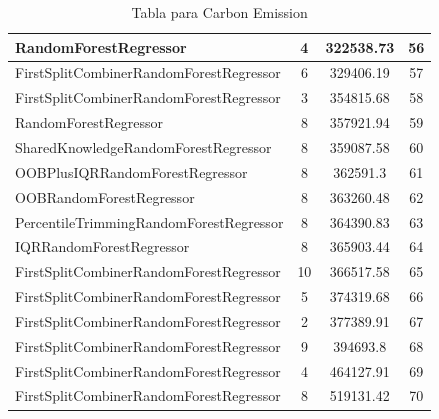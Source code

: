 \begin{table}[h]
\begin{tabular}{|l|c|c|c|}
\textcolor[HTML]{87bc45}{RandomForestRegressor} & 4 & 322538.73 & 56 \\ \hline
\textcolor[HTML]{ea5545}{FirstSplitCombinerRandomForestRegressor} & 6 & 329406.19 & 57 \\ \hline
\textcolor[HTML]{ea5545}{FirstSplitCombinerRandomForestRegressor} & 3 & 354815.68 & 58 \\ \hline
\textcolor[HTML]{87bc45}{RandomForestRegressor} & 8 & 357921.94 & 59 \\ \hline
\textcolor[HTML]{ef9b20}{SharedKnowledgeRandomForestRegressor} & 8 & 359087.58 & 60 \\ \hline
\textcolor[HTML]{ede15b}{OOBPlusIQRRandomForestRegressor} & 8 & 362591.3 & 61 \\ \hline
\textcolor[HTML]{b33dc6}{OOBRandomForestRegressor} & 8 & 363260.48 & 62 \\ \hline
\textcolor[HTML]{f46a9b}{PercentileTrimmingRandomForestRegressor} & 8 & 364390.83 & 63 \\ \hline
\textcolor[HTML]{27aeef}{IQRRandomForestRegressor} & 8 & 365903.44 & 64 \\ \hline
\textcolor[HTML]{ea5545}{FirstSplitCombinerRandomForestRegressor} & 10 & 366517.58 & 65 \\ \hline
\textcolor[HTML]{ea5545}{FirstSplitCombinerRandomForestRegressor} & 5 & 374319.68 & 66 \\ \hline
\textcolor[HTML]{ea5545}{FirstSplitCombinerRandomForestRegressor} & 2 & 377389.91 & 67 \\ \hline
\textcolor[HTML]{ea5545}{FirstSplitCombinerRandomForestRegressor} & 9 & 394693.8 & 68 \\ \hline
\textcolor[HTML]{ea5545}{FirstSplitCombinerRandomForestRegressor} & 4 & 464127.91 & 69 \\ \hline
\textcolor[HTML]{ea5545}{FirstSplitCombinerRandomForestRegressor} & 8 & 519131.42 & 70 \\ \hline
\end{tabular}
\caption{Tabla para Carbon Emission}
\end{table}


